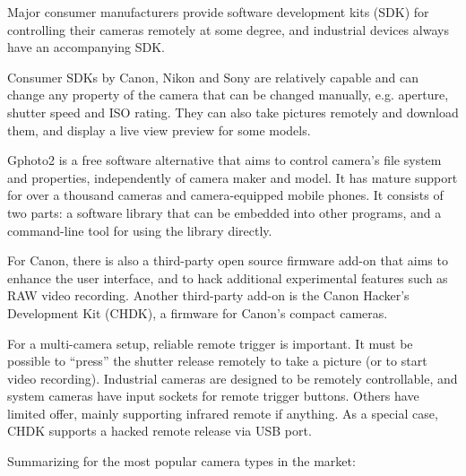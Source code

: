 Major consumer manufacturers provide software development kits (SDK) for controlling their cameras remotely at some degree, and industrial devices always have an accompanying SDK.

Consumer SDKs by Canon, Nikon and Sony are relatively capable and can change any property of the camera that can be changed manually, e.g. aperture, shutter speed and ISO rating.
They can also take pictures remotely and download them, and display a live view preview for some models.

Gphoto2 is a free software alternative that aims to control camera's file system and properties, independently of camera maker and model.
It has mature support for over a thousand cameras and camera-equipped mobile phones.
It consists of two parts: a software library that can be embedded into other programs, and a command-line tool for using the library directly.

For Canon, there is also a third-party open source firmware add-on that aims to enhance the user interface, and to hack additional experimental features such as RAW video recording.
Another third-party add-on is the Canon Hacker's Development Kit (CHDK), a firmware for Canon's compact cameras.

For a multi-camera setup, reliable remote trigger is important.
It must be possible to ``press'' the shutter release remotely to take a picture (or to start video recording).
Industrial cameras are designed to be remotely controllable, and system cameras have input sockets for remote trigger buttons.
Others have limited offer, mainly supporting infrared remote if anything.
As a special case, CHDK supports a hacked remote release via USB port.


Summarizing for the most popular camera types in the market:

